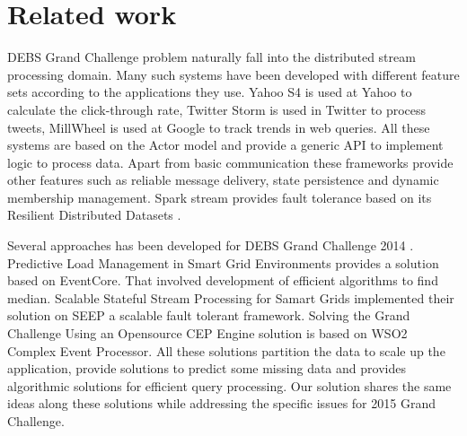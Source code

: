 \section{Related work}
DEBS Grand Challenge problem naturally fall into the distributed stream processing domain. Many such systems have been developed with different feature sets according to the applications they use. Yahoo S4 \cite{neumeyer2010s4} is used at Yahoo to calculate the click-through rate, Twitter Storm \cite{toshniwal2014storm} is used in Twitter to process tweets, MillWheel \cite{akidau2013millwheel} is used at Google to track trends in web queries. All these systems are based on the Actor model \cite{agha1985actors} and provide a generic API to implement logic to process data. Apart from basic communication these frameworks provide other features such as reliable message delivery, state persistence and dynamic membership management. Spark stream \cite{zaharia2012discretized} provides fault tolerance based on its Resilient Distributed Datasets \cite{zaharia2012resilient}.  

Several approaches has been developed for DEBS Grand Challenge 2014 \cite{jerzak2014debs}. Predictive Load Management in Smart Grid Environments \cite{mutschler2014predictive} provides a solution based on EventCore. That involved development of efficient algorithms to find median. Scalable Stateful Stream Processing for Samart Grids \cite{fernandez2014scalable} implemented their solution on SEEP \cite{castro2013integrating} a scalable fault tolerant framework. Solving the Grand Challenge Using an Opensource CEP Engine \cite{perera2014solving} solution is based on WSO2 Complex Event Processor. All these solutions partition the data to scale up the application, provide solutions to predict some missing data and provides algorithmic solutions for efficient query processing. Our solution shares the same ideas along these solutions while addressing the specific issues for 2015 Grand Challenge.

